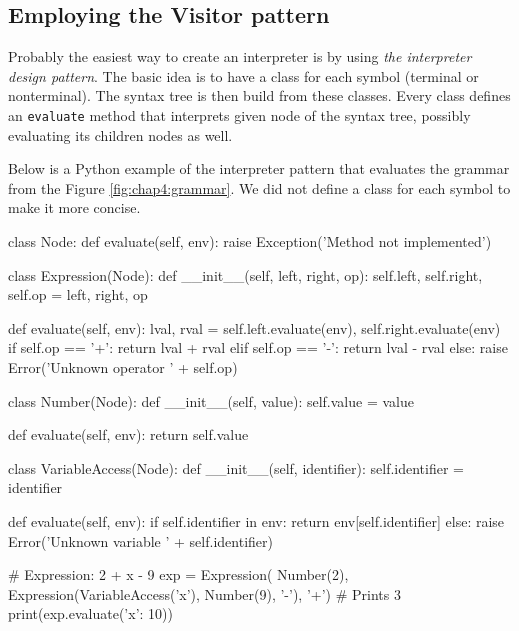 \subsection{Employing the Visitor pattern}
Probably the easiest way to create an interpreter is by using \emph{the interpreter design pattern}. The basic idea is to have a class for each symbol
(terminal or nonterminal). The syntax tree is then build from these classes. Every class defines an \texttt{evaluate} method that interprets given node
of the syntax tree, possibly evaluating its children nodes as well.

Below is a Python example of the interpreter pattern that evaluates the grammar from the Figure \ref{fig:chap4:grammar}. We did not define a class for each
symbol to make it more concise.
\begin{code}
class Node:
    def evaluate(self, env):
        raise Exception('Method not implemented')

class Expression(Node):
    def __init__(self, left, right, op):
        self.left, self.right, self.op = left, right, op

    def evaluate(self, env):
        lval, rval = self.left.evaluate(env), self.right.evaluate(env)
        if self.op == '+':
            return lval + rval
        elif self.op == '-':
            return lval - rval
        else:
            raise Error('Unknown operator ' + self.op)

class Number(Node):
    def __init__(self, value):
        self.value = value
    
    def evaluate(self, env):
        return self.value

class VariableAccess(Node):
    def __init__(self, identifier):
        self.identifier = identifier
    
    def evaluate(self, env):
        if self.identifier in env:
            return env[self.identifier]
        else:
            raise Error('Unknown variable ' + self.identifier)

# Expression: 2 + x - 9
exp = Expression(
    Number(2),
    Expression(VariableAccess('x'), Number(9), '-'),
    '+')
# Prints 3
print(exp.evaluate({'x': 10}))
\end{code}

